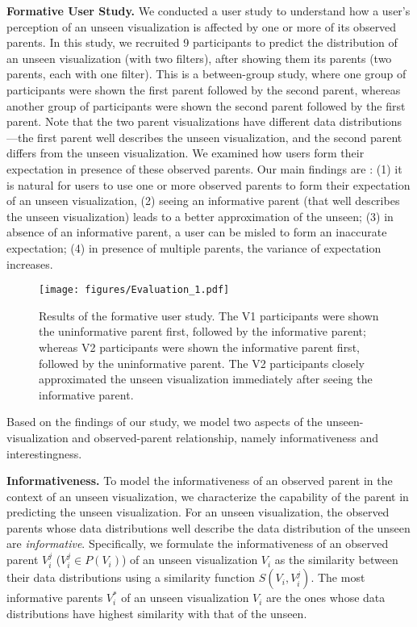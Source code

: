 \textbf{Formative User Study.} We conducted a user study to understand how a user's perception of an unseen visualization is affected by one or more of its observed parents. In this study, we recruited 9 participants to predict the distribution of an unseen visualization (with two filters), after showing them its parents (two parents, each with one filter). This is a between-group study, where one group of participants were shown the first parent followed by the second parent, whereas another group of participants were shown the second parent followed by the first parent. Note that the two parent visualizations have different data distributions---the first parent well describes the unseen visualization, and the second parent differs from the unseen visualization. We examined how users form their expectation in presence of these observed parents. Our main findings are : (1) it is natural for users to use one or more observed parents to form their expectation of an unseen visualization, (2) seeing an informative parent (that well describes the unseen visualization) leads to a better approximation of the unseen; (3) in absence of an informative parent, a user can be misled to form an inaccurate expectation; (4) in presence of multiple parents, the variance of expectation increases.

\begin{figure}[bht]
\label{example}
\texttt{[image: figures/Evaluation\_1.pdf]}
\caption{Results of the formative user study. The V1 participants were shown the uninformative parent first, followed by the informative parent; whereas V2 participants were shown the informative parent first, followed by the uninformative parent. The V2 participants closely approximated the unseen visualization immediately after seeing the informative parent.}
\end{figure}

Based on the findings of our study, we model two aspects of the unseen-visualization and observed-parent relationship, namely informativeness and interestingness. 

\textbf{Informativeness.} To model the informativeness of an observed parent in the context of an unseen visualization, we characterize the capability of the parent in predicting the unseen visualization. For an unseen visualization, the observed parents whose data distributions well describe the data distribution of the unseen are \emph{informative}. Specifically, we formulate the informativeness of an observed parent $V_i^j$ ($V_i^j \in P(V_i)$) of an unseen visualization $V_i$ as the similarity between their data distributions using a similarity function $S(V_i, V_i^j)$. The most informative parents $V_i^*$ of an unseen visualization $V_i$ are the ones whose data distributions have highest similarity with that of the unseen.

